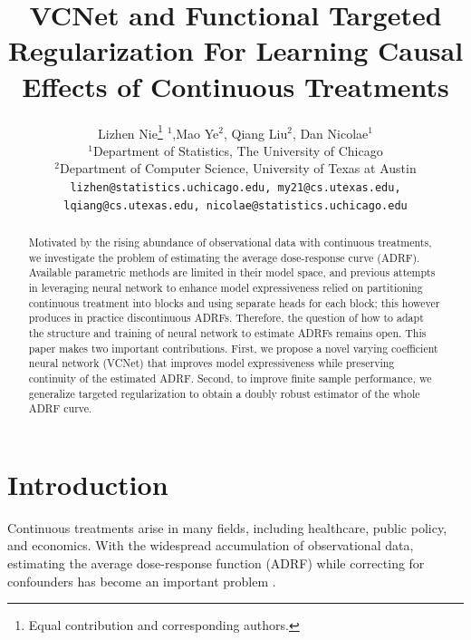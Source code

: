 \documentclass{article} %
\title{VCNet and Functional Targeted Regularization For Learning Causal Effects of Continuous Treatments}
\author{Lizhen Nie\thanks{Equal contribution and corresponding authors.}$^{\,\,\,1}$,\quad Mao Ye\printfnsymbol{1}$^{2}$, \quad Qiang Liu$^{2}$,  \quad Dan Nicolae$^{1}$ \\
$^1$Department of Statistics,
The University of Chicago\\
$^2$Department of Computer Science,
University of Texas at Austin\\
\texttt{lizhen@statistics.uchicago.edu, my21@cs.utexas.edu,}\\
\texttt{lqiang@cs.utexas.edu, nicolae@statistics.uchicago.edu} 
}
\begin{document}
\maketitle

\begin{abstract}
    Motivated by the rising abundance of observational data with continuous treatments, we investigate the problem of estimating the average dose-response curve (ADRF). Available parametric methods are limited in their model space, and previous attempts in leveraging neural network to enhance model expressiveness relied on partitioning continuous treatment into blocks and using separate heads for each block; this however produces in practice discontinuous ADRFs. Therefore, the question of how to adapt the structure and training of neural network to estimate ADRFs remains open. This paper makes two important contributions. First, we propose a novel varying coefficient neural network (VCNet) that improves model expressiveness while preserving continuity of the estimated ADRF. Second, to improve finite sample performance, we generalize targeted regularization to obtain a doubly robust estimator of the whole ADRF curve.
\end{abstract}

\section{Introduction}\label{sec:introduction}
Continuous treatments arise in many fields, including healthcare, public policy, and economics. With the widespread accumulation of observational data, estimating the average dose-response function (ADRF) while correcting for confounders has become an important problem \citep{hirano2004propensity, imai2004causal, kennedy2017non, fong2018covariate}.
\end{document}
